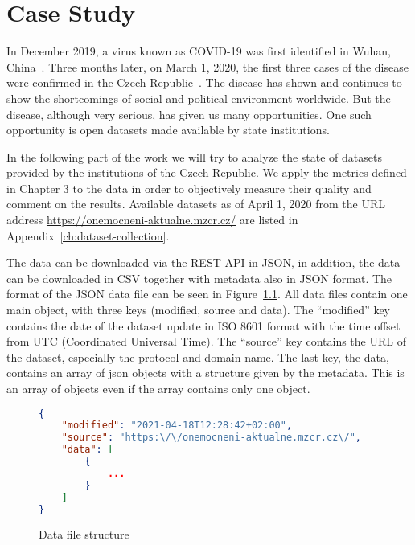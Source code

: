 \chapter{Case Study}\label{ch:case-study}

In December 2019, a virus known as COVID-19 was first identified in Wuhan, China~\cite{seznamKorona2021}.
Three months later, on March 1, 2020, the first three cases of the disease were confirmed in the Czech Republic~\cite{seznamKorona2021}.
The disease has shown and continues to show the shortcomings of social and political environment worldwide.
But the disease, although very serious, has given us many opportunities.
One such opportunity is open datasets made available by state institutions.

In the following part of the work we will try to analyze the state of datasets provided by the institutions of the Czech Republic.
We apply the metrics defined in Chapter 3 to the data in order to objectively measure their quality and comment on the results.
Available datasets as of April 1, 2020 from the URL address \url{https://onemocneni-aktualne.mzcr.cz/} are listed in Appendix~\ref{ch:dataset-collection}.

The data can be downloaded via the REST API in JSON, in addition, the data can be downloaded in CSV together with metadata also in JSON format.
The format of the JSON data file can be seen in Figure~\ref{ls:data}.
All data files contain one main object, with three keys (modified, source and data).
The \enquote{modified} key contains the date of the dataset update in ISO 8601 format with the time offset from UTC (Coordinated Universal Time).
The \enquote{source} key contains the URL of the dataset, especially the protocol and domain name.
The last key, the data, contains an array of json objects with a structure given by the metadata.
This is an array of objects even if the array contains only one object.

\begin{figure}[htb]
    \centering
    
    \begin{lstlisting}[language=json,firstnumber=1]
{
    "modified": "2021-04-18T12:28:42+02:00",
    "source": "https:\/\/onemocneni-aktualne.mzcr.cz\/",
    "data": [
        {
            ...
        }
    ]
}
    \end{lstlisting}

    \caption{Data file structure}
    \label{ls:data}
\end{figure}
\FloatBarrier

